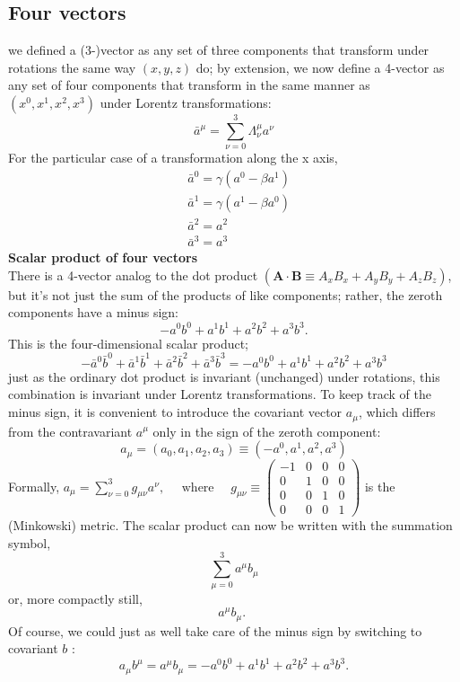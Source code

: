 \subsection{Four vectors}
 we defined a (3-)vector as any set of three components that transform under rotations the same way $(x, y, z)$ do; by extension, we now define a 4-vector as any set of four components that transform in the same manner as $\left(x^{0}, x^{1}, x^{2}, x^{3}\right)$ under Lorentz transformations:\\
 $$\bar{a}^{\mu}=\sum_{\nu=0}^{3} \Lambda_{\nu}^{\mu} a^{\nu}$$
 For the particular case of a transformation along the x axis, 
$$\begin{aligned}
	&\bar{a}^{0}=\gamma\left(a^{0}-\beta a^{1}\right) \\
	&\bar{a}^{1}=\gamma\left(a^{1}-\beta a^{0}\right) \\
	&\bar{a}^{2}=a^{2} \\
	&\bar{a}^{3}=a^{3}
\end{aligned}$$
\textbf{Scalar product of four vectors}\\
There is a 4-vector analog to the dot product $\left(\mathbf{A} \cdot \mathbf{B} \equiv A_{x} B_{x}+A_{y} B_{y}+A_{z} B_{z}\right)$, but it's not just the sum of the products of like components; rather, the zeroth components have a minus sign:
$$
-a^{0} b^{0}+a^{1} b^{1}+a^{2} b^{2}+a^{3} b^{3} .
$$
 This is the four-dimensional scalar product;\\
 $$
 -\bar{a}^{0} \bar{b}^{0}+\bar{a}^{1} \bar{b}^{1}+\bar{a}^{2} \bar{b}^{2}+\bar{a}^{3} \bar{b}^{3}=-a^{0} b^{0}+a^{1} b^{1}+a^{2} b^{2}+a^{3} b^{3}
 $$
 just as the ordinary dot product is invariant (unchanged) under rotations, this combination is invariant under Lorentz transformations.
To keep track of the minus sign, it is convenient to introduce the covariant vector $a_{\mu}$, which differs from the contravariant $a^{\mu}$ only in the sign of the zeroth component:
$$
a_{\mu}=\left(a_{0}, a_{1}, a_{2}, a_{3}\right) \equiv\left(-a^{0}, a^{1}, a^{2}, a^{3}\right)
$$
 Formally,
 $a_{\mu}=\sum_{\nu=0}^{3} g_{\mu \nu} a^{\nu}, \quad \text { where } \quad g_{\mu \nu} \equiv\left(\begin{array}{rrrr}
 	-1 & 0 & 0 & 0 \\
 	0 & 1 & 0 & 0 \\
 	0 & 0 & 1 & 0 \\
 	0 & 0 & 0 & 1
 \end{array}\right)$
 is the (Minkowski) metric.
The scalar product can now be written with the summation symbol,
$$
\sum_{\mu=0}^{3} a^{\mu} b_{\mu}
$$
or, more compactly still,
$$
a^{\mu} b_{\mu} \text {. }
$$
 Of course, we could just as well take care of the minus sign by switching to covariant $b$ :
$$
a_{\mu} b^{\mu}=a^{\mu} b_{\mu}=-a^{0} b^{0}+a^{1} b^{1}+a^{2} b^{2}+a^{3} b^{3} .
$$
